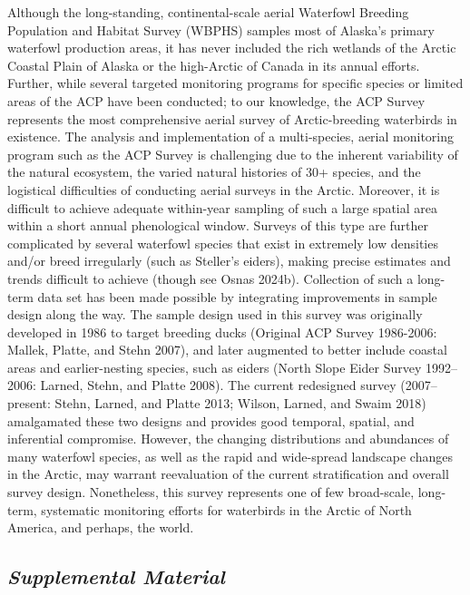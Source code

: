 \documentclass[
]{article}
\begin{document}
Although the long-standing, continental-scale aerial Waterfowl Breeding
Population and Habitat Survey (WBPHS) samples most of Alaska's primary
waterfowl production areas, it has never included the rich wetlands of
the Arctic Coastal Plain of Alaska or the high-Arctic of Canada in its
annual efforts. Further, while several targeted monitoring programs for
specific species or limited areas of the ACP have been conducted; to our
knowledge, the ACP Survey represents the most comprehensive aerial
survey of Arctic-breeding waterbirds in existence. The analysis and
implementation of a multi-species, aerial monitoring program such as the
ACP Survey is challenging due to the inherent variability of the natural
ecosystem, the varied natural histories of 30+ species, and the
logistical difficulties of conducting aerial surveys in the Arctic.
Moreover, it is difficult to achieve adequate within-year sampling of
such a large spatial area within a short annual phenological window.
Surveys of this type are further complicated by several waterfowl
species that exist in extremely low densities and/or breed irregularly
(such as Steller's eiders), making precise estimates and trends
difficult to achieve (though see Osnas 2024b). Collection of such a
long-term data set has been made possible by integrating improvements in
sample design along the way. The sample design used in this survey was
originally developed in 1986 to target breeding ducks (Original ACP
Survey 1986-2006: Mallek, Platte, and Stehn 2007), and later augmented
to better include coastal areas and earlier-nesting species, such as
eiders (North Slope Eider Survey 1992--2006: Larned, Stehn, and Platte
2008). The current redesigned survey (2007--present: Stehn, Larned, and
Platte 2013; Wilson, Larned, and Swaim 2018) amalgamated these two
designs and provides good temporal, spatial, and inferential compromise.
However, the changing distributions and abundances of many waterfowl
species, as well as the rapid and wide-spread landscape changes in the
Arctic, may warrant reevaluation of the current stratification and
overall survey design. Nonetheless, this survey represents one of few
broad-scale, long-term, systematic monitoring efforts for waterbirds in
the Arctic of North America, and perhaps, the world.

\subsection*{\texorpdfstring{\emph{Supplemental
Material}}{Supplemental Material}}\label{supplemental-material}
\end{document}
